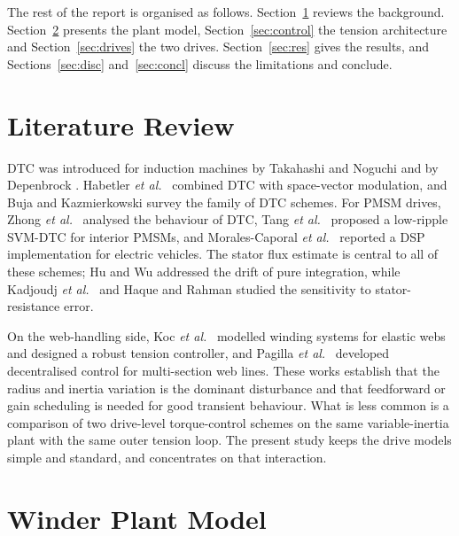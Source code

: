 \documentclass[12pt,a4paper,onecolumn]{IEEEtran}
\begin{document}
The rest of the report is organised as follows. Section~\ref{sec:lit} reviews the background. Section~\ref{sec:plant} presents the plant model, Section~\ref{sec:control} the tension architecture and Section~\ref{sec:drives} the two drives. Section~\ref{sec:res} gives the results, and Sections~\ref{sec:disc} and~\ref{sec:concl} discuss the limitations and conclude.

\section{Literature Review}\label{sec:lit}
DTC was introduced for induction machines by Takahashi and Noguchi \cite{takahashi1986} and by Depenbrock \cite{depenbrock1988}. Habetler \emph{et al.}\ \cite{habetler1992} combined DTC with space-vector modulation, and Buja and Kazmierkowski \cite{buja2004} survey the family of DTC schemes. For PMSM drives, Zhong \emph{et al.}\ \cite{zhong1997} analysed the behaviour of DTC, Tang \emph{et al.}\ \cite{tang2004} proposed a low-ripple SVM-DTC for interior PMSMs, and Morales-Caporal \emph{et al.}\ \cite{morales2018} reported a DSP implementation for electric vehicles. The stator flux estimate is central to all of these schemes; Hu and Wu \cite{hu1998} addressed the drift of pure integration, while Kadjoudj \emph{et al.}\ \cite{kadjoudj2007} and Haque and Rahman \cite{haque2000} studied the sensitivity to stator-resistance error.

On the web-handling side, Koc \emph{et al.}\ \cite{koc2002} modelled winding systems for elastic webs and designed a robust tension controller, and Pagilla \emph{et al.}\ \cite{pagilla2007} developed decentralised control for multi-section web lines. These works establish that the radius and inertia variation is the dominant disturbance and that feedforward or gain scheduling is needed for good transient behaviour. What is less common is a comparison of two drive-level torque-control schemes on the same variable-inertia plant with the same outer tension loop. The present study keeps the drive models simple and standard, and concentrates on that interaction.

\section{Winder Plant Model}\label{sec:plant}
\end{document}
